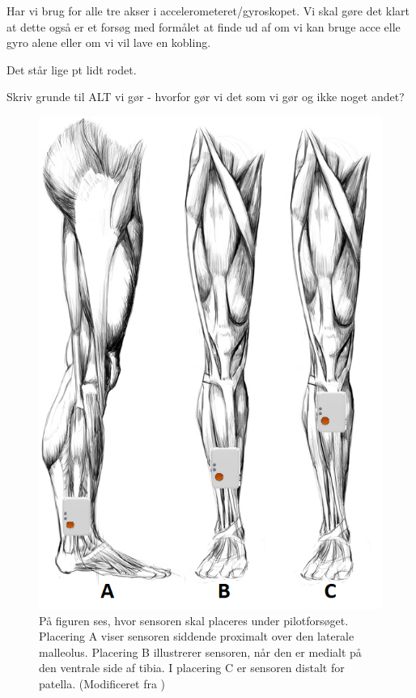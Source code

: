 Har vi brug for alle tre akser i accelerometeret/gyroskopet. 
Vi skal gøre det klart at dette også er et forsøg med formålet at finde ud af om vi kan bruge acce elle gyro alene eller om vi vil lave en kobling.

Det står lige pt lidt rodet. 

Skriv grunde til ALT vi gør - hvorfor gør vi det som vi gør og ikke noget andet? 






\begin{figure}[H]
	\centering
	\includegraphics[scale=0.6]{figures/qBilag/Sensor_placering.png}
	\caption{På figuren ses, hvor sensoren skal placeres under pilotforsøget. Placering A viser sensoren siddende proximalt over den laterale malleolus. Placering B illustrerer sensoren, når den er medialt på den ventrale side af tibia. I placering C er sensoren distalt for patella. (Modificeret fra \cite{Perna2016,Shimmer2016})}
	\label{fig:sensor_placering}
\end{figure}
